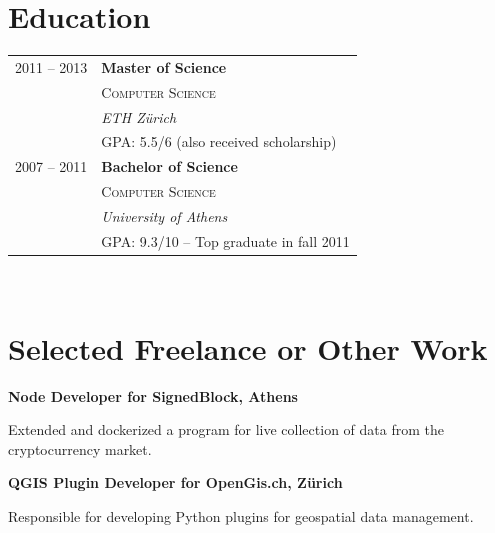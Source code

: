 \documentclass[10pt]{article} %
\begin{document}
\begin{minipage}[t]{0.5\textwidth} %
\vspace{0pt} %
	

\section{Education} 

\begin{tabular}{rl} %



2011 -- 2013 & \textbf{Master of Science} \\ 
& \textsc{Computer Science} \\ 
& \textit{ETH Z\"urich}\\
    \small  & GPA: 5.5/6 (also received scholarship) \\
2007 -- 2011 & \textbf{Bachelor of Science}\\
& \textsc{Computer Science} \\
& \textit{University of Athens} \\
\small  & GPA: 9.3/10 -- Top graduate in fall 2011\\
	
\end{tabular}\\[9pt]


\section{Selected Freelance or Other Work} 


{\raggedright\large \textbf{Node Developer for SignedBlock, Athens}\\
}

\normalsize{Extended and dockerized a program for live collection of data from the cryptocurrency market.}
\\

{\raggedright\large \textbf{QGIS Plugin Developer for OpenGis.ch, Z\"urich}\\
}

\normalsize{Responsible for developing Python plugins for geospatial data management.}\\


\end{minipage}
\end{document}
